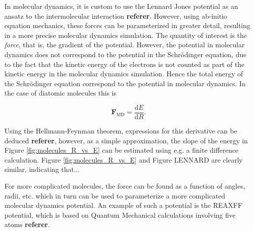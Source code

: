 In molecular dynamics, it is custom to use the Lennard Jones potential as an ansatz to the intermolecular interaction \textbf{referer}. However, using ab-initio equation mechanics, these forces can be parameterized in greater detail, resulting in a more precise molecular dynamics simulation. The quantity of interest is the \textit{force}, that is, the gradient of the potential. However, the potential in molecular dynamics does not correspond to the potential in the Schrödinger equation, due to the fact that the kinetic energy of the electrons is not counted as part of the kinetic energy in the molecular dynamics simulation. Hence the total energy of the Schrödinger equation correspond to the potential in molecular dynamics. In the case of diatomic molecules this is 

\begin{equation}
 \mathbf{F}_\mathrm{MD} = \frac{\mathrm{d}E}{\mathrm{d}R}.
\end{equation}


Using the Hellmann-Feynman theorem, expressions for this derivative can be deduced \textbf{referer}, however, as a simple approximation, the slope of the energy in Figure \ref{fig:molecules_R_vs_E} can be estimated using e.g. a finite difference calculation. Figure \ref{fig:molecules_R_vs_E} and Figure LENNARD are clearly similar, indicating that...

For more complicated molecules, the force can be found as a function of angles, radii, etc. which in turn can be used to parameterize a more complicated molecular dynamics potential. An example of such a potential is the REAXFF potential, which is based on Quantum Mechanical calculations involving five atoms \textbf{referer}.


